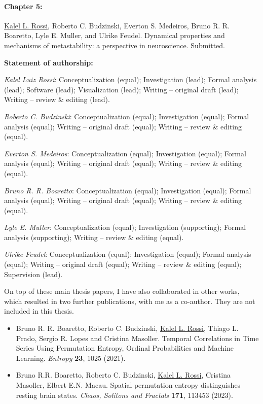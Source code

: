 \paragraph{Chapter 5:}
\underline{Kalel L. Rossi}, Roberto C. Budzinski, Everton S. Medeiros, Bruno R. R. Boaretto, Lyle E. Muller, and Ulrike Feudel. Dynamical properties and mechanisms of metastability: a perspective in neuroscience. Submitted.

{\vspace{0.3cm}\footnotesize \textbf{Statement of authorship:} %

\textit{Kalel Luiz Rossi}: Conceptualization (equal); Investigation (lead); Formal analysis (lead); Software (lead); Visualization (lead); Writing – original draft (lead); Writing – review \& editing (lead). 

\textit{Roberto C. Budzinski}: Conceptualization (equal); Investigation (equal); Formal analysis (equal); Writing – original draft (equal); Writing – review \& editing (equal).

\textit{Everton S. Medeiros}: Conceptualization (equal); Investigation (equal); Formal analysis (equal); Writing – original draft (equal); Writing – review \& editing (equal).

\textit{Bruno R. R. Boaretto}: Conceptualization (equal); Investigation (equal); Formal analysis (equal); Writing – original draft (equal); Writing – review \& editing (equal).

\textit{Lyle E. Muller}: Conceptualization (equal); Investigation (supporting); Formal analysis (supporting);  Writing – review \& editing (equal).

\textit{Ulrike Feudel}: Conceptualization (equal); Investigation (equal); Formal analysis (equal); Writing – original draft (equal); Writing – review \& editing (equal); Supervision (lead).
}

\vspace{1cm}


On top of these main thesis papers, I have also collaborated in other works, which resulted in two further publications, with me as a co-author. They are not included in this thesis.
\begin{itemize}
    \item Bruno R. R. Boaretto, Roberto C. Budzinski, \underline{Kalel L. Rossi}, Thiago L. Prado, Sergio R. Lopes and Cristina Masoller. Temporal Correlations in Time Series Using Permutation Entropy, Ordinal Probabilities and Machine Learning. \textit{Entropy} \textbf{23}, 1025 (2021).
    \item Bruno R.R. Boaretto, Roberto C. Budzinski, \underline{Kalel L. Rossi}, Cristina Masoller, Elbert E.N. Macau. Spatial permutation entropy distinguishes resting brain states. \textit{Chaos, Solitons and Fractals} \textbf{171}, 113453 (2023).
\end{itemize}